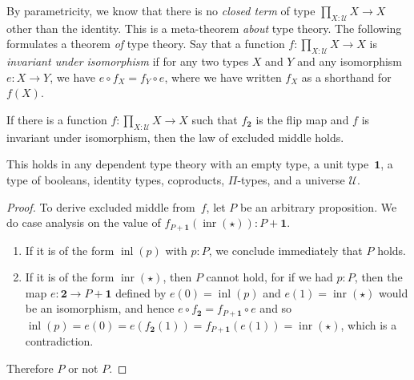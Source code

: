 \documentclass[a4paper,UKenglish]{lipics-v2016}
\newcommand{\comp}{\mathrel{\circ}}
\newcommand{\UU}{\mathcal{U}}
\newcommand{\ttt}{\star}
\newcommand{\unit}{\mathbf{1}}
\newcommand{\bool}{\mathbf{2}}
\newcommand{\inl}{{\operatorname{inl}}}
\newcommand{\inr}{{\operatorname{inr}}}
\begin{document}
By parametricity, we know that there is no \emph{closed term} of type
$\prod_{X : \UU} X \to X$ other than the identity. This is a meta-theorem \emph{about} type
theory. The following formulates a theorem \emph{of} type theory.  Say
that a function $f:\prod_{X : \UU} X \to X$ is \emph{invariant under
  isomorphism} if for any two types $X$ and $Y$ and any isomorphism
$e:X \to Y$, we have $e \comp f_X = f_Y \comp e$, where we have
written $f_X$ as a shorthand for $f(X)$.
\begin{theorem}
\label{thm:identity-bool}
If there is a function $f:\prod_{X : \UU} X \to X$ such that $f_\bool$
is the flip map and $f$ is invariant under isomorphism, then the law
of excluded middle holds.
\end{theorem}
This holds in any dependent type theory with
an empty type, a unit type~$\unit$, a type of booleans, identity types,
coproducts, $\Pi$-types, and a universe $\UU$.
\begin{proof}
  To derive excluded middle from~$f$, let $P$ be an arbitrary
  proposition. We do case analysis on the value of
  $f_{P+\unit}(\inr(\ttt)) : P+\unit$.
  \begin{enumerate}
  \item If it is of the form $\inl(p)$ with $p:P$, we conclude
    immediately that $P$ holds.
  \item If it is of the form $\inr(\ttt)$, then $P$ cannot hold, for if
    we had $p:P$, then the map $e : \bool \to P + \unit$ defined by $e(0)=\inl(p)$ and $e(1)=\inr(\ttt)$ would be an isomorphism, and hence $e \comp f_\bool = f_{P+\unit} \comp e$ and so
  $ \inl(p) = e(0) = e (f_\bool(1)) = f_{P+\unit} (e(1)) = \inr(\ttt)$, which is a contradiction.
  \end{enumerate}
Therefore $P$ or not $P$.
%
\end{proof}
\end{document}
